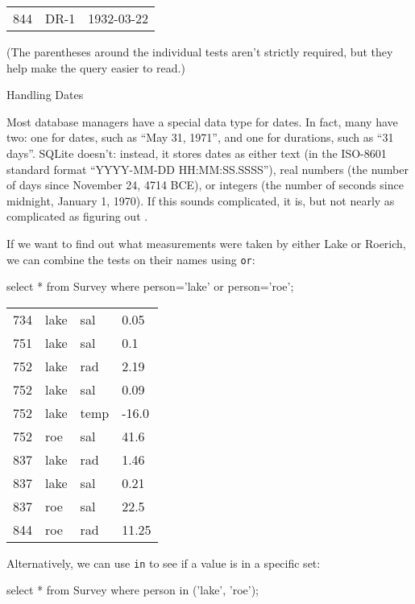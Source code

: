 \documentclass{book}
\begin{document}
\begin{tabular}{lll}
844 & DR-1 & 1932-03-22 \\
\end{tabular}

(The parentheses around the individual tests aren't strictly required,
but they help make the query easier to read.)

\begin{swcbox}{Handling Dates}

Most database managers have a special data type for dates. In fact, many
have two: one for dates, such as ``May 31, 1971'', and one for
durations, such as ``31 days''. SQLite doesn't: instead, it stores dates
as either text (in the ISO-8601 standard format ``YYYY-MM-DD
HH:MM:SS.SSSS''), real numbers (the number of days since November 24,
4714 BCE), or integers (the number of seconds since midnight, January 1,
1970). If this sounds complicated, it is, but not nearly as complicated
as figuring out
.

\end{swcbox}

If we want to find out what measurements were taken by either Lake or
Roerich, we can combine the tests on their names using \texttt{or}:

\begin{VerbIn}
select * from Survey where person='lake' or person='roe';
\end{VerbIn}

\begin{tabular}{llll}
734 & lake & sal & 0.05 \\
751 & lake & sal & 0.1 \\
752 & lake & rad & 2.19 \\
752 & lake & sal & 0.09 \\
752 & lake & temp & -16.0 \\
752 & roe & sal & 41.6 \\
837 & lake & rad & 1.46 \\
837 & lake & sal & 0.21 \\
837 & roe & sal & 22.5 \\
844 & roe & rad & 11.25 \\
\end{tabular}

Alternatively, we can use \texttt{in} to see if a value is in a specific
set:

\begin{VerbIn}
select * from Survey where person in ('lake', 'roe');
\end{VerbIn}
\end{document}
